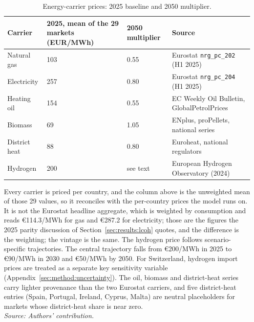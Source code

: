 \begin{table}[H]
\centering
\caption{Energy-carrier prices: 2025 baseline and 2050 multiplier.}
\label{tab:prices}
\begin{tabularx}{\textwidth}{lXXX}
\toprule
Carrier & 2025, mean of the 29 markets (EUR/MWh) & 2050 multiplier & Source \\
\midrule
Natural gas   & 103 & 0.55      & Eurostat \texttt{nrg\_pc\_202} (H1 2025) \\
Electricity   & 257 & 0.80      & Eurostat \texttt{nrg\_pc\_204} (H1 2025) \\
Heating oil   & 154 & 0.55      & EC Weekly Oil Bulletin, GlobalPetrolPrices \\
Biomass       & 69  & 1.05      & ENplus, proPellets, national series \\
District heat & 88  & 0.80      & Euroheat, national regulators \\
Hydrogen      & 200 & see text  & European Hydrogen Observatory (2024) \\
\bottomrule
\end{tabularx}
\par\addvspace{8pt}
\raggedright\small
Every carrier is priced per country, and the column above is the unweighted mean of
those 29 values, so it reconciles with the per-country prices the model runs on. It is
not the Eurostat headline aggregate, which is weighted by consumption and reads
\euro{}114.3/MWh for gas and \euro{}287.2 for electricity; those are the figures the
2025 parity discussion of Section~\ref{sec:results:lcoh} quotes, and the difference is the weighting; the vintage is the same. The hydrogen price follows scenario-specific trajectories. The central trajectory falls from
\euro{}200/MWh in 2025 to \euro{}90/MWh in 2030 and \euro{}50/MWh by 2050. For
Switzerland, hydrogen import prices are treated as a separate key sensitivity variable
(Appendix~\ref{sec:method:uncertainty}). The oil, biomass and district-heat series carry
lighter provenance than the two Eurostat carriers, and five district-heat entries (Spain,
Portugal, Ireland, Cyprus, Malta) are neutral placeholders for markets whose
district-heat share is near zero.
\\[2pt]{\footnotesize\textit{Source: Authors' contribution.}}
\end{table}


